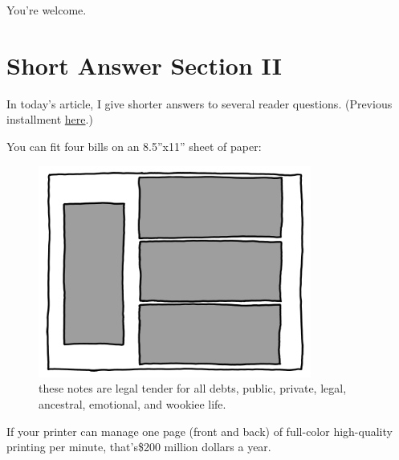 {You’re welcome.}

{
\chapter{Short Answer Section II}
}
{In today’s article, I give shorter answers to several reader questions. (Previous installment \href{http://what-if.xkcd.com/14/}{here}.)}


\hfill{}

{You can fit four bills on an 8.5”x11” sheet of paper:}

\begin{figure}[!htbp]
\centering
\includegraphics[scale=0.5, max width=0.8\textwidth]{imgs/a/23/short_bills.png}
\caption{these notes are legal tender for all debts, public, private, legal, ancestral, emotional, and wookiee life.}
\end{figure}

{If your printer can manage one page (front and back) of full-color high-quality printing per minute, that’s\$200 million dollars a year.}

